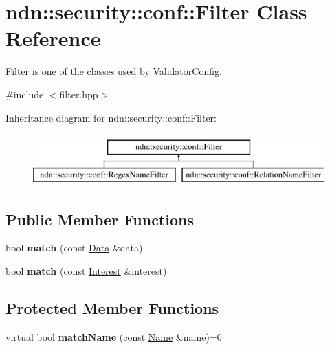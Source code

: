 \hypertarget{classndn_1_1security_1_1conf_1_1Filter}{}\section{ndn\+:\+:security\+:\+:conf\+:\+:Filter Class Reference}
\label{classndn_1_1security_1_1conf_1_1Filter}


\hyperlink{classndn_1_1security_1_1conf_1_1Filter}{Filter} is one of the classes used by \hyperlink{classndn_1_1ValidatorConfig}{Validator\+Config}.  




{\ttfamily \#include $<$filter.\+hpp$>$}

Inheritance diagram for ndn\+:\+:security\+:\+:conf\+:\+:Filter\+:\begin{figure}[H]
\begin{center}
\leavevmode
\includegraphics[height=2.000000cm]{classndn_1_1security_1_1conf_1_1Filter}
\end{center}
\end{figure}
\subsection*{Public Member Functions}
\begin{DoxyCompactItemize}
\item 
bool {\bfseries match} (const \hyperlink{classndn_1_1Data}{Data} \&data)\hypertarget{classndn_1_1security_1_1conf_1_1Filter_a0b856b5a4e4f4f7ca7b45b9c7b37dbc6}{}\label{classndn_1_1security_1_1conf_1_1Filter_a0b856b5a4e4f4f7ca7b45b9c7b37dbc6}

\item 
bool {\bfseries match} (const \hyperlink{classndn_1_1Interest}{Interest} \&interest)\hypertarget{classndn_1_1security_1_1conf_1_1Filter_ab389d7aae8e7859be45fc25ebee38d0a}{}\label{classndn_1_1security_1_1conf_1_1Filter_ab389d7aae8e7859be45fc25ebee38d0a}

\end{DoxyCompactItemize}
\subsection*{Protected Member Functions}
\begin{DoxyCompactItemize}
\item 
virtual bool {\bfseries match\+Name} (const \hyperlink{classndn_1_1Name}{Name} \&name)=0\hypertarget{classndn_1_1security_1_1conf_1_1Filter_a9c9f33c854434233ae6e280cdb3477fd}{}\label{classndn_1_1security_1_1conf_1_1Filter_a9c9f33c854434233ae6e280cdb3477fd}

\end{DoxyCompactItemize}



